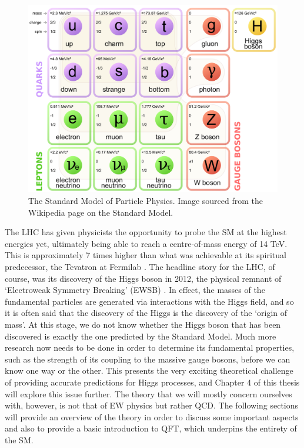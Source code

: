 \begin{figure}[t]
\centering
\includegraphics[scale=0.2]{Images/SM.png} 
\caption{The Standard Model of Particle Physics. Image sourced from the Wikipedia page on the Standard Model.}
\label{fig:SM}
\end{figure}

The LHC has given physicists the opportunity to probe the SM at the highest energies yet, ultimately being able to reach a centre-of-mass energy of 14 TeV. This is approximately 7 times higher than what was achievable at its spiritual predecessor, the Tevatron at Fermilab \cite{Holmes2011}. The headline story for the LHC, of course, was its discovery of the Higgs boson in 2012, the physical remnant of `Electroweak Symmetry Breaking' (EWSB) \cite{Aad2012,Higgs1964}. In effect, the masses of the fundamental particles are generated via interactions with the Higgs field, and so it is often said that the discovery of the Higgs is the discovery of the `origin of mass'. At this stage, we do not know whether the Higgs boson that has been discovered is exactly the one predicted by the Standard Model. Much more research now needs to be done in order to determine its fundamental properties, such as the strength of its coupling to the massive gauge bosons, before we can know one way or the other. This presents the very exciting theoretical challenge of providing accurate predictions for Higgs processes, and Chapter 4 of this thesis will explore this issue further. The theory that we will mostly concern ourselves with, however, is not that of EW physics but rather QCD. The following sections will provide an overview of the theory in order to discuss some important aspects and also to provide a basic introduction to QFT, which underpins the entirety of the SM. 

